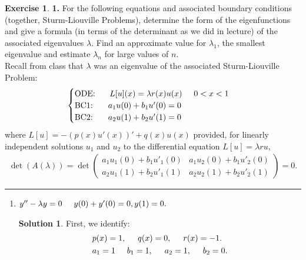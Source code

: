 \documentclass{book}
\theoremstyle{definition}
\newtheorem*{exer*}{Exercise}
\newtheorem*{sln*}{Solution}
\begin{document}
\begin{exer*}\textbf{1.}
	For the following equations and associated boundary conditions (together, Sturm-Liouville Problems),
	determine the form of the eigenfunctions and give a formula (in terms of the determinant as we did in lecture) of
	the associated eigenvalues $\lambda$. Find an approximate value for $\lambda_1$, the smallest eigenvalue and estimate $\lambda_n$ for large
	values of $n$.\\
	
	Recall from class that $\lambda$ was an eigenvalue of the associated Sturm-Liouville Problem:
	\begin{align*}
	\begin{cases}
	\text{ODE: }\hspace{0.5cm} L[u](x) = \lambda r(x)u(x)\hspace{0.5cm} 0<x<1\\
	\text{BC1: }\hspace{0.5cm} a_1u(0) + b_1 u'(0) = 0\\
	\text{BC2: }\hspace{0.5cm} a_2u(1) + b_2u'(1) = 0
	\end{cases}
	\end{align*}
	where $L[u] = -(p(x)u'(x))' + q(x)u(x)$ provided, for linearly independent solutions $u_1$ and $u_2$ to the differential
	equation $L[u] = \lambda ru$,
	\begin{align*}
	\det(A(\lambda)) = \det\begin{pmatrix}
	a_1u_1(0) + b_1 u'_1(0) & a_1u_2(0) + b_1 u'_2(0)\\
	a_2u_1(1) + b_2 u'_1(1) & a_2u_2(1) + b_2 u'_2(1)
	\end{pmatrix} = 0.
	\end{align*}
	
	\noindent\rule{\textwidth}{0.5pt}
	\begin{enumerate}
		\item $y'' - \lambda y = 0\hspace{0.5cm} y(0) + y'(0) = 0, y(1) = 0.$\\
		
		\begin{sln*}
			First, we identify:
			\begin{align*}
			&p(x) = 1,\hspace{0.5cm} q(x) = 0,\hspace{0.5cm} r(x) = -1.\\
			&a_1 = 1\hspace{0.5cm} b_1 = 1,\hspace{0.5cm}a_2 = 1,\hspace{0.5cm} b_2 = 0.
			\end{align*}
			

\end{sln*}
\end{enumerate}
\end{exer*}
\end{document}
